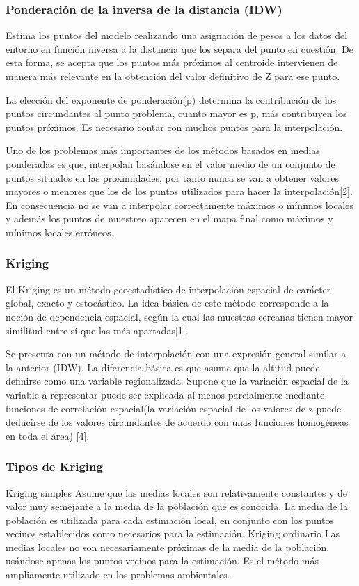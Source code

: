 \subsubsection{Ponderación de la inversa de la distancia (IDW)}
Estima los puntos del modelo realizando una asignación de pesos a los datos
del entorno en función inversa a la distancia que los separa del punto en
cuestión. De esta forma, se acepta  que  los puntos más próximos al centroide
intervienen de manera más relevante en la obtención del valor definitivo
de Z para ese punto.

La elección del exponente de ponderación(p) determina la contribución de
los puntos circundantes al punto problema, cuanto mayor es p, más contribuyen
los puntos próximos. Es necesario contar con muchos puntos para la interpolación.

Uno de los problemas más importantes de los métodos basados en medias
ponderadas es que, interpolan basándose en el valor medio de un conjunto
de puntos situados en las proximidades, por tanto nunca se van a obtener
valores mayores o menores que los de los puntos utilizados para hacer la
interpolación[2]. En consecuencia no se van a interpolar correctamente
máximos o mínimos locales y además los puntos de muestreo aparecen en el
mapa final como máximos y mínimos locales erróneos.

\subsubsection{Kriging}
El Kriging es un método geoestadístico de interpolación espacial de carácter
global, exacto y estocástico. La idea básica de este método corresponde a
la noción de dependencia espacial, según la cual las muestras cercanas
tienen mayor similitud entre sí que las más apartadas[1].

Se presenta con un método de interpolación con una expresión general
similar a la anterior (IDW). La diferencia básica es que asume que la
altitud puede definirse como una variable regionalizada. Supone que la
variación espacial de la variable a representar puede ser explicada al
menos parcialmente mediante funciones de correlación espacial(la variación
espacial de los valores de z puede deducirse de los valores circundantes
de acuerdo con unas funciones homogéneas en toda el área) [4].

\subsubsection{Tipos de Kriging}
Kriging simples
Asume que las medias locales son relativamente constantes y de valor muy
semejante a la media de la población que es conocida. La media de la
población es utilizada para cada estimación local, en conjunto con los
puntos vecinos establecidos como necesarios para la estimación.
Kriging ordinario
Las medias locales no son necesariamente próximas de la media de la población,
usándose apenas los puntos vecinos para la estimación. Es el método más
ampliamente utilizado en los problemas ambientales.

